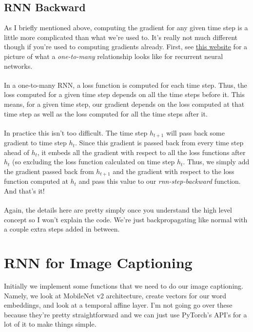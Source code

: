 \documentclass[12pt]{article}
\begin{document}
\subsection{RNN Backward}
As I briefly mentioned above, computing the gradient for any given time step is
a little more complicated than what we're used to. It's really not much different
though if you're used to computing gradients already. First, see 
\href{https://calvinfeng.gitbook.io/machine-learning-notebook/supervised-learning/recurrent-neural-network/recurrent_neural_networks}
{this website} for a picture of what a \emph{one-to-many} relationship looks like 
for recurrent neural networks. 
~\\
~\\
In a one-to-many RNN, a loss function is computed for each time step. Thus, the loss 
computed for a given time step depends on all the time steps before it. This means, 
for a given time step, our gradient depends on the loss computed at that time step 
as well as the loss computed for all the time steps after it. 
~\\
~\\
In practice this isn't too difficult. The time step $h_{t + 1}$ will pass back some 
gradient to time step $h_t$. Since this gradient is passed back from every time 
step ahead of $h_t$, it embeds all the gradient with respect to all the loss functions 
after $h_t$ (so excluding the loss function calculated on time step $h_t$. Thus, 
we simply add the gradient passed back from $h_{t+1}$ and the gradient with respect 
to the loss function computed at $h_t$ and pass this value to our 
\emph{rnn-step-backward} function. And that's it! 
~\\
~\\
Again, the details here are pretty simply once you understand the high level 
concept so I won't explain the code. We're just backpropagating like normal 
with a couple extra steps added in between. 

\section{RNN for Image Captioning}

Initially we implement some functions that we need to do our image captioning. Namely, 
we look at MobileNet v2 architecture, create vectors for our word embeddings, and 
look at a temporal affine layer. I'm not going go over these because they're pretty 
straightforward and we can just use PyTorch's API's for a lot of it to make things 
simple. 
\end{document}
